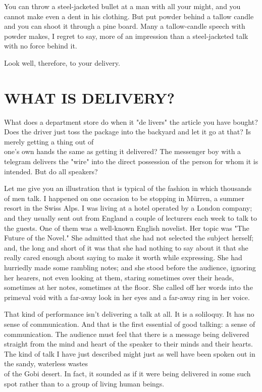 \documentclass[10pt]{article}
\begin{document}
You can throw a steel-jacketed bullet at a man with all your might, and you cannot make even a dent in his clothing. But put powder behind a tallow candle and you can shoot it through a pine board. Many a tallow-candle speech with powder makes, I regret to say, more of an impression than a steel-jacketed talk with no force behind it.

Look well, therefore, to your delivery.

\section*{WHAT IS DELIVERY?}
What does a department store do when it "de livers" the article you have bought? Does the driver just toss the package into the backyard and let it go at that? Is merely getting a thing out of\\
one's own hands the same as getting it delivered? The messenger boy with a telegram delivers the "wire" into the direct possession of the person for whom it is intended. But do all speakers?

Let me give you an illustration that is typical of the fashion in which thousands of men talk. I happened on one occasion to be stopping in Mürren, a summer resort in the Swiss Alps. I was living at a hotel operated by a London company; and they usually sent out from England a couple of lecturers each week to talk to the guests. One of them was a well-known English novelist. Her topic was "The Future of the Novel." She admitted that she had not selected the subject herself; and, the long and short of it was that she had nothing to say about it that she really cared enough about saying to make it worth while expressing. She had hurriedly made some rambling notes; and she stood before the audience, ignoring her hearers, not even looking at them, staring sometimes over their heads, sometimes at her notes, sometimes at the floor. She called off her words into the primeval void with a far-away look in her eyes and a far-away ring in her voice.

That kind of performance isn't delivering a talk at all. It is a soliloquy. It has no sense of communication. And that is the first essential of good talking: a sense of communication. The audience must feel that there is a message being delivered straight from the mind and heart of the speaker to their minds and their hearts. The kind of talk I have just described might just as well have been spoken out in the sandy, waterless wastes\\
of the Gobi desert. In fact, it sounded as if it were being delivered in some such spot rather than to a group of living human beings.
\end{document}
